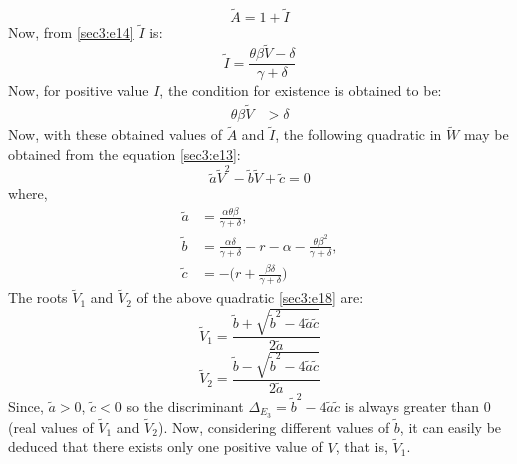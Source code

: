 \documentclass[12pt]{article}
\numberwithin{equation}{section}
\begin{document}
\begin{enumerate}[i)]
\begin{equation}
\tilde A=1+\tilde I
\end{equation}
Now, from \eqref{sec3:e14} $\tilde I$ is:
\begin{equation}\label{sec3:e16}
\tilde I = \frac{\theta \beta \tilde V-\delta}{\gamma +\delta}
\end{equation}
Now, for positive value $I$, the condition for existence is obtained to be:
\begin{align}\label{sec3:e17}
\theta \beta \tilde V &>\delta
\end{align}
Now, with these obtained values of $\tilde A$ and $\tilde I$, the following quadratic in $\tilde W$ may be obtained from the equation \eqref{sec3:e13}:
\begin{equation}\label{sec3:e18}
\tilde a \tilde V^2 - \tilde b \tilde V + \tilde  c =0
\end{equation}
where,
\begin{align}\label{sec3:e19}
\tilde a &= \frac{\alpha \theta \beta}{\gamma +\delta},\\
\tilde b &= \frac{\alpha \delta}{\gamma + \delta} -r-\alpha -\frac{\theta \beta^2}{\gamma + \delta},\\
\tilde c &= -\bigg( r+\frac{\beta \delta}{\gamma + \delta}\bigg)
\end{align}
The roots $\tilde V_1$ and $\tilde V_2$ of the above quadratic \eqref{sec3:e18} are:
\begin{equation}\label{sec3:e20}
\tilde V_1 = \frac{\tilde b + \sqrt{\tilde b^2 - 4\tilde a \tilde c}}{2 \tilde a}
\end{equation}
\begin{equation}\label{sec3:e21}
\tilde V_2 = \frac{\tilde b - \sqrt{\tilde b^2 - 4\tilde a \tilde c}}{2 \tilde a}
\end{equation}
Since, $\tilde a>0$, $\tilde c<0$ so the discriminant $\Delta_{E_3}=\tilde b^{2}-4\tilde a \tilde c$ is always greater than $0$ (real values of $\tilde V_1$ and $\tilde V_2$). Now, considering different values of $\tilde b$, it can easily be deduced that there exists only one positive value of $V$, that is, $\tilde V_1$.\\

\end{enumerate}
\end{document}
